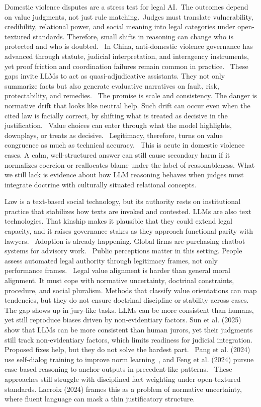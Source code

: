 Domestic violence disputes are a stress test for legal AI.~The outcomes depend on value judgments, not just rule matching.~\cite{ref1}Judges must translate vulnerability, credibility, relational power, and social meaning into legal categories under open-textured standards. Therefore, small shifts in reasoning can change who is protected and who is doubted.~\cite{ref2} In China, anti-domestic violence governance has advanced through statute, judicial interpretation, and interagency instruments, yet proof friction and coordination failures remain common in practice.~\cite{ref3} These gaps invite LLMs to act as quasi-adjudicative assistants. They not only summarize facts but also generate evaluative narratives on fault, risk, protectability, and remedies.~\cite{ref4} The promise is scale and consistency. The danger is normative drift that looks like neutral help. Such drift can occur even when the cited law is facially correct, by shifting what is treated as decisive in the justification.~\cite{ref5} Value choices can enter through what the model highlights, downplays, or treats as decisive.~\cite{ref6} Legitimacy, therefore, turns on value congruence as much as technical accuracy.~\cite{ref7} This is acute in domestic violence cases. A calm, well-structured answer can still cause secondary harm if it normalizes coercion or reallocates blame under the label of reasonableness. What we still lack is evidence about how LLM reasoning behaves when judges must integrate doctrine with culturally situated relational concepts.~\cite{ref8}

Law is a text-based social technology, but its authority rests on institutional practice that stabilizes how texts are invoked and contested. LLMs are also text technologies. That kinship makes it plausible that they could extend legal capacity, and it raises governance stakes as they approach functional parity with lawyers.~\cite{ref9} Adoption is already happening. Global firms are purchasing chatbot systems for advisory work.~\cite{ref10} Public perceptions matter in this setting. People assess automated legal authority through legitimacy frames, not only performance frames.~\cite{ref11} Legal value alignment is harder than general moral alignment. It must cope with normative uncertainty, doctrinal constraints, procedure, and social pluralism. Methods that classify value orientations can map tendencies, but they do not ensure doctrinal discipline or stability across cases.~\cite{ref12} The gap shows up in jury-like tasks. LLMs can be more consistent than humans, yet still reproduce biases driven by non-evidentiary factors. Sun et al. (2025) show that LLMs can be more consistent than human jurors, yet their judgments still track non-evidentiary factors, which limits readiness for judicial integration. Proposed fixes help, but they do not solve the hardest part.~\cite{ref13} Pang et al. (2024) use self-dialog training to improve norm learning~\cite{ref14}, and Feng et al. (2024) pursue case-based reasoning to anchor outputs in precedent-like patterns.~\cite{ref15} These approaches still struggle with disciplined fact weighting under open-textured standards. Lacroix (2024) frames this as a problem of normative uncertainty, where fluent language can mask a thin justificatory structure.~\cite{ref16}

